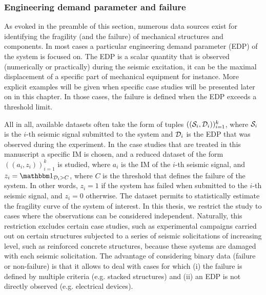 










\subsubsection{Engineering demand parameter and failure}


As evoked in the preamble of this section, numerous data sources exist for identifying the fragility (and the failure) of mechanical structures and components.
In most cases a particular engineering demand parameter (EDP) of the system is focused on. The EDP is a scalar quantity that is observed (numerically or practically) during the seismic excitation, it can be the maximal displacement of a specific part of mechanical equipment for instance. More explicit examples will be given when specific case studies will be presented later on in this chapter. 
In those cases, the failure is defined when the EDP exceeds a threshold limit.

All in all, available datasets often take the form of tuples $((\mathcal{S}_i,\mathcal{D}_i))_{i=1}^k$, where $\mathcal{S}_i$ is the $i$-th seismic signal submitted to the system and $\mathcal{D}_i$ is the EDP that was observed during the experiment. %
%
In the case studies that are treated in this manuscript a specific IM is chosen, and a reduced dataset of the form $((a_i,z_i))_{i=1}^k$ is studied, where $a_i$ is the IM of the $i$-th seismic signal, and $z_i=\indic_{\cD_i> C }$, where $ C $ is the threshold that defines the failure of the system. In other words, $z_i=1$ if the system has failed when submitted to the  $i$-th seismic signal, and $z_i=0$ otherwise.
The dataset permits to statistically estimate the fragility curve of the system of interest. In this thesis, we restrict the study to cases where the observations can be considered independent. 
Naturally, this restriction excludes certain case studies, such as experimental campaigns carried out on certain structures subjected to a series of seismic solicitations of increasing level, such as reinforced concrete structures, because these systems are damaged with each seismic solicitation.
%
The advantage of considering binary data (failure or non-failure) is that it allows to deal with cases for which (i) the failure is defined by multiple criteria (e.g. stacked structures) and (ii) an EDP is not directly observed (e.g. electrical devices).


